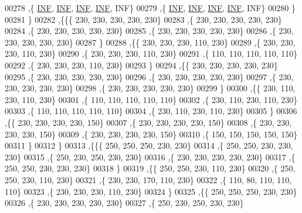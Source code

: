\begin{DoxyCode}
00278    ,\{   \hyperlink{energy__const_8h_a12c2040f25d8e3a7b9e1c2024c618cb6}{INF},   \hyperlink{energy__const_8h_a12c2040f25d8e3a7b9e1c2024c618cb6}{INF},   \hyperlink{energy__const_8h_a12c2040f25d8e3a7b9e1c2024c618cb6}{INF},   \hyperlink{energy__const_8h_a12c2040f25d8e3a7b9e1c2024c618cb6}{INF},   INF\}
00279    ,\{   \hyperlink{energy__const_8h_a12c2040f25d8e3a7b9e1c2024c618cb6}{INF},   \hyperlink{energy__const_8h_a12c2040f25d8e3a7b9e1c2024c618cb6}{INF},   \hyperlink{energy__const_8h_a12c2040f25d8e3a7b9e1c2024c618cb6}{INF},   \hyperlink{energy__const_8h_a12c2040f25d8e3a7b9e1c2024c618cb6}{INF},   INF\}
00280    \}
00281   \}
00282  ,\{\{\{   230,   230,   230,   230,   230\}
00283    ,\{   230,   230,   230,   230,   230\}
00284    ,\{   230,   230,   230,   230,   230\}
00285    ,\{   230,   230,   230,   230,   230\}
00286    ,\{   230,   230,   230,   230,   230\}
00287    \}
00288   ,\{\{   230,   230,   230,   110,   230\}
00289    ,\{   230,   230,   230,   110,   230\}
00290    ,\{   230,   230,   230,   110,   230\}
00291    ,\{   110,   110,   110,   110,   110\}
00292    ,\{   230,   230,   230,   110,   230\}
00293    \}
00294   ,\{\{   230,   230,   230,   230,   230\}
00295    ,\{   230,   230,   230,   230,   230\}
00296    ,\{   230,   230,   230,   230,   230\}
00297    ,\{   230,   230,   230,   230,   230\}
00298    ,\{   230,   230,   230,   230,   230\}
00299    \}
00300   ,\{\{   230,   110,   230,   110,   230\}
00301    ,\{   110,   110,   110,   110,   110\}
00302    ,\{   230,   110,   230,   110,   230\}
00303    ,\{   110,   110,   110,   110,   110\}
00304    ,\{   230,   110,   230,   110,   230\}
00305    \}
00306   ,\{\{   230,   230,   230,   230,   150\}
00307    ,\{   230,   230,   230,   230,   150\}
00308    ,\{   230,   230,   230,   230,   150\}
00309    ,\{   230,   230,   230,   230,   150\}
00310    ,\{   150,   150,   150,   150,   150\}
00311    \}
00312   \}
00313  ,\{\{\{   250,   250,   250,   230,   230\}
00314    ,\{   250,   250,   230,   230,   230\}
00315    ,\{   250,   230,   250,   230,   230\}
00316    ,\{   230,   230,   230,   230,   230\}
00317    ,\{   250,   250,   230,   230,   230\}
00318    \}
00319   ,\{\{   250,   250,   230,   110,   230\}
00320    ,\{   250,   250,   230,   110,   230\}
00321    ,\{   230,   230,   170,   110,   230\}
00322    ,\{   110,    80,   110,   110,   110\}
00323    ,\{   230,   230,   230,   110,   230\}
00324    \}
00325   ,\{\{   250,   250,   250,   230,   230\}
00326    ,\{   230,   230,   230,   230,   230\}
00327    ,\{   250,   230,   250,   230,   230\}

\end{DoxyCode}
